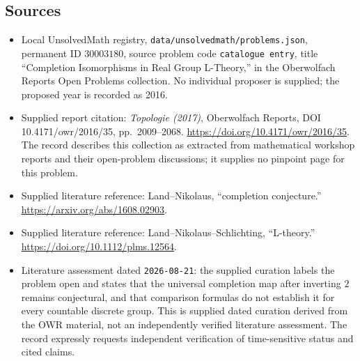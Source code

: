 \documentclass[11pt]{article}
\begin{document}
\subsection{Sources}
\begin{itemize}
\item Local UnsolvedMath registry, \texttt{data/unsolvedmath/problems.json}, permanent ID \(30003180\), source problem code \texttt{catalogue entry}, title ``Completion Isomorphisms in Real Group L-Theory,'' in the Oberwolfach Reports Open Problems collection. No individual proposer is supplied; the proposed year is recorded as 2016.
\item Supplied report citation: \emph{Topologie (2017)}, Oberwolfach Reports, DOI 10.4171/owr/2016/35, pp.\ 2009--2068. \url{https://doi.org/10.4171/owr/2016/35}. The record describes this collection as extracted from mathematical workshop reports and their open-problem discussions; it supplies no pinpoint page for this problem.
\item Supplied literature reference: Land--Nikolaus, ``completion conjecture.'' \url{https://arxiv.org/abs/1608.02903}.
\item Supplied literature reference: Land--Nikolaus--Schlichting, ``L-theory.'' \url{https://doi.org/10.1112/plms.12564}.
\item Literature assessment dated \texttt{2026-08-21}: the supplied curation labels the problem open and states that the universal completion map after inverting \(2\) remains conjectural, and that comparison formulas do not establish it for every countable discrete group. This is supplied dated curation derived from the OWR material, not an independently verified literature assessment. The record expressly requests independent verification of time-sensitive status and cited claims.
\end{itemize}
\end{document}
